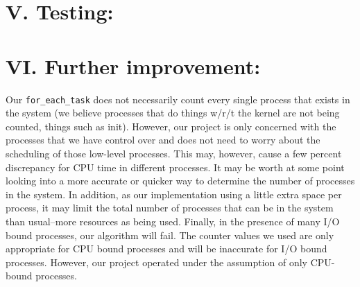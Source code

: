 \documentclass[10pt]{article}
\begin{document}
\section{V. Testing:}

\section{VI. Further improvement:}

Our \texttt{for\_each\_task} does not necessarily count every single process that exists in the system (we believe processes that do things w/r/t the kernel are not being counted, things such as init). However, our project is only concerned with the processes that we have control over and does not need to worry about the scheduling of those low-level processes. This may, however, cause a few percent discrepancy for CPU time in different processes. It may be worth at some point looking into a more accurate or quicker way to determine the number of processes in the system. In addition, as our implementation using a little extra space per process, it may limit the total number of processes that can be in the system than usual--more resources as being used. Finally, in the presence of many I/O bound processes, our algorithm will fail. The counter values we used are only appropriate for CPU bound processes and will be inaccurate for I/O bound processes. However, our project operated under the assumption of only CPU-bound processes.
\end{document}
